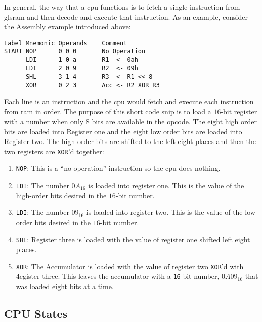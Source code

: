 In general, the way that a \gls{cpu} functions is to fetch a single instruction from gls{ram} and then decode and execute that instruction. As an example, consider the Assembly example introduced above:

\begin{Verbatim}[commandchars=~\[\], samepage=true, fontfamily=courier]
Label Mnemonic Operands    Comment
START NOP      0 0 0       No Operation
      LDI      1 0 a       R1  <- 0ah
      LDI      2 0 9       R2  <- 09h
      SHL      3 1 4       R3  <- R1 << 8
      XOR      0 2 3       Acc <- R2 XOR R3
\end{Verbatim}

Each line is an instruction and the \gls{cpu} would fetch and execute each instruction from \gls{ram} in order. The purpose of this short code snip is to load a $ 16 $-bit register with a number when only $ 8 $ bits are available in the opcode. The eight high order bits are loaded into Register one and the eight low order bits are loaded into Register two. The high order bits are shifted to the left eight places and then the two registers are \lstinline[columns=fixed]|XOR|'d together:

\begin{enumerate}
  \item \lstinline[columns=fixed]|NOP|: This is a ``no operation'' instruction so the \gls{cpu} does nothing.
  \item \lstinline[columns=fixed]|LDI|: The number $ 0A_{16} $ is loaded into register one. This is the value of the high-order bits desired in the $ 16 $-bit number.
  \item \lstinline[columns=fixed]|LDI|: The number $ 09_{16} $ is loaded into register two.  This is the value of the low-order bits desired in the $ 16 $-bit number.
  \item \lstinline[columns=fixed]|SHL|: Register three is loaded with the value of register one shifted left eight places.
  \item \lstinline[columns=fixed]|XOR|: The Accumulator is loaded with the value of register two \lstinline[columns=fixed]|XOR|'d with 4egister three. This leaves the accumulator with a \lstinline[columns=fixed]|16|-bit number, $ 0A09_{16} $ that was loaded eight bits at a time.
\end{enumerate}

\subsection{CPU States}
\label{SIM:subsec:cpu_states}

